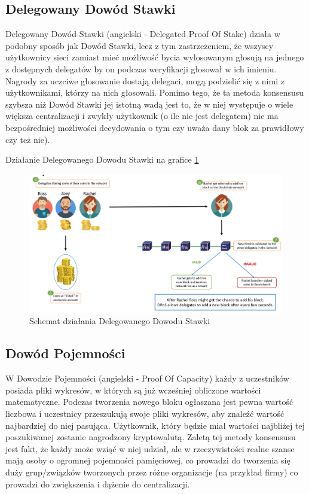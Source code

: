 \subsection{Delegowany Dowód Stawki}

Delegowany Dowód Stawki (angielski - Delegated Proof Of Stake) działa w podobny sposób jak Dowód Stawki, lecz z tym zastrzeżeniem, że wszyscy użytkownicy sieci zamiast mieć możliwość bycia wylosowanym głosują na jednego z dostępnych delegatów by on podczas weryfikacji głosował w ich imieniu. Nagrody za uczciwe głosowanie dostają delegaci, mogą podzielić się z nimi z użytkownikami, którzy na nich głosowali. Pomimo tego, że ta metoda konsensusu szybsza niż Dowód Stawki jej istotną wadą jest to, że w niej występuje o wiele większa centralizacji i zwykły użytkownik (o ile nie jest delegatem) nie ma bezpośredniej możliwości decydowania o tym czy uważa dany blok za prawidłowy czy też nie).

\vspace{0.3\baselineskip}

Działanie Delegowanego Dowodu Stawki na grafice \ref{fig:ConsensusDPOS}
\begin{figure}[H]
    \centering
    \includegraphics[width=\textwidth]{Images/ConsensusDPOS.png}
    \caption{Schemat działania Delegowanego Dowodu Stawki}
    \label{fig:ConsensusDPOS}
\end{figure}

\subsection{Dowód Pojemności}

W Dowodzie Pojemności (angielski - Proof Of Capacity) każdy z uczestników posiada pliki wykresów, w których są już wcześniej obliczone wartości matematyczne. Podczas tworzenia nowego bloku ogłaszana jest pewna wartość liczbowa i uczestnicy przeszukują swoje pliki wykresów, aby znaleźć wartość najbardziej do niej pasująca. Użytkownik, który będzie miał wartości najbliżej tej poszukiwanej zostanie nagrodzony kryptowalutą. Zaletą tej metody konsensusu jest fakt, że każdy może wziąć w niej udział, ale w rzeczywistości realne szanse mają osoby o ogromnej pojemności pamięciowej, co prowadzi do tworzenia się duży grup/związków tworzonych przez różne organizacje (na przykład firmy) co prowadzi do zwiększenia i dążenie do centralizacji.

